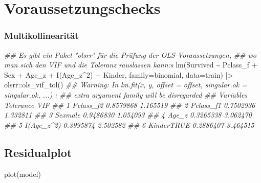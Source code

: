 \documentclass[
  10pt,
  letterpaper,
  a4paper, twoside]{scrreprt}
\newenvironment{Shaded}{\begin{snugshade}}{\end{snugshade}}
\newcommand{\AttributeTok}[1]{\textcolor[rgb]{0.40,0.45,0.13}{#1}}
\newcommand{\DecValTok}[1]{\textcolor[rgb]{0.68,0.00,0.00}{#1}}
\newcommand{\DocumentationTok}[1]{\textcolor[rgb]{0.37,0.37,0.37}{\textit{#1}}}
\newcommand{\FunctionTok}[1]{\textcolor[rgb]{0.28,0.35,0.67}{#1}}
\newcommand{\NormalTok}[1]{\textcolor[rgb]{0.00,0.23,0.31}{#1}}
\newcommand{\SpecialCharTok}[1]{\textcolor[rgb]{0.37,0.37,0.37}{#1}}
\begin{document}
\section{Voraussetzungschecks}\label{voraussetzungschecks-1}

\subsubsection{Multikollinearität}\label{multikollinearituxe4t-1}

\begin{Shaded}
\begin{Highlighting}[]
\DocumentationTok{\#\# Es gibt ein Paket "olsrr" für die Prüfung der OLS{-}Voraussetzungen, }
\DocumentationTok{\#\# wo man sich den VIF und die Toleranz rauslassen kann:s}
\FunctionTok{lm}\NormalTok{(Survived }\SpecialCharTok{\textasciitilde{}}\NormalTok{ Pclass\_f }\SpecialCharTok{+}\NormalTok{ Sex }\SpecialCharTok{+}\NormalTok{ Age\_z }\SpecialCharTok{+} \FunctionTok{I}\NormalTok{(Age\_z}\SpecialCharTok{\^{}}\DecValTok{2}\NormalTok{) }\SpecialCharTok{+}\NormalTok{ Kinder,  }\AttributeTok{family=}\NormalTok{binomial, }
          \AttributeTok{data=}\NormalTok{train) }\SpecialCharTok{|\textgreater{}} 
\NormalTok{  olsrr}\SpecialCharTok{::}\FunctionTok{ols\_vif\_tol}\NormalTok{() }
\DocumentationTok{\#\# Warning: In lm.fit(x, y, offset = offset, singular.ok = singular.ok, ...) :}
\DocumentationTok{\#\#  extra argument \textquotesingle{}family\textquotesingle{} will be disregarded}
\DocumentationTok{\#\#    Variables Tolerance      VIF}
\DocumentationTok{\#\# 1  Pclass\_f2 0.8579868 1.165519}
\DocumentationTok{\#\# 2  Pclass\_f1 0.7502936 1.332811}
\DocumentationTok{\#\# 3    Sexmale 0.9486830 1.054093}
\DocumentationTok{\#\# 4      Age\_z 0.3265338 3.062470}
\DocumentationTok{\#\# 5 I(Age\_z\^{}2) 0.3995874 2.502582}
\DocumentationTok{\#\# 6 KinderTRUE 0.2886407 3.464515}
\end{Highlighting}
\end{Shaded}

\subsection{Residualplot}\label{residualplot-1}

\begin{Shaded}
\begin{Highlighting}[]
\FunctionTok{plot}\NormalTok{(model)}
\end{Highlighting}
\end{Shaded}
\end{document}
